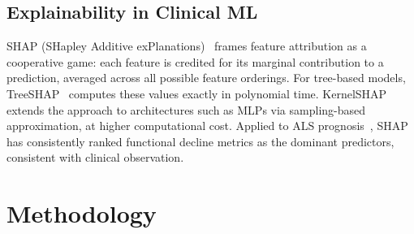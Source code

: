 \documentclass[preprint,12pt]{elsarticle}
\begin{document}
\subsection{Explainability in Clinical ML}

SHAP (SHapley Additive exPlanations)~\cite{lundberg2017shap} frames feature
attribution as a cooperative game: each feature is credited for its marginal
contribution to a prediction, averaged across all possible feature orderings.
For tree-based models, TreeSHAP~\cite{lundberg2020treeshap} computes these values
exactly in polynomial time. KernelSHAP extends the approach to architectures such
as MLPs via sampling-based approximation, at higher computational cost. Applied
to ALS prognosis~\cite{Anani2023}, SHAP has consistently ranked functional decline
metrics as the dominant predictors, consistent with clinical observation.

\section{Methodology}
\label{sec:methodology}
\end{document}
